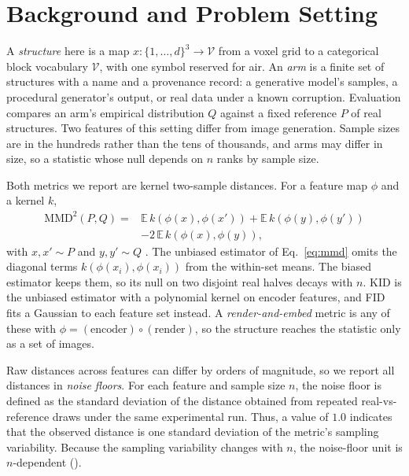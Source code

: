 \section{Background and Problem Setting}
\label{sec:background}

A \emph{structure} here is a map $x : \{1,\dots,d\}^3 \to \mathcal{V}$ from a voxel grid to a
categorical block vocabulary $\mathcal{V}$, with one symbol reserved for air. An
\emph{arm} is a finite set of structures with a name and a provenance record: a
generative model's samples, a procedural generator's output, or real data under a known
corruption. Evaluation compares an arm's empirical distribution $Q$ against a fixed
reference $P$ of real structures. Two features of this setting differ from image
generation. Sample sizes are in the hundreds rather than the tens of thousands, and arms
may differ in size, so a statistic whose null depends on $n$ ranks by sample size.

Both metrics we report are kernel two-sample distances. For a feature map $\phi$ and a
kernel $k$,
\begin{equation}
\begin{split}
\mathrm{MMD}^2(P,Q) ={}& \mathbb{E}\,k(\phi(x),\phi(x')) + \mathbb{E}\,k(\phi(y),\phi(y'))\\
  &- 2\,\mathbb{E}\,k(\phi(x),\phi(y)),
\end{split}
\label{eq:mmd}
\end{equation}
with $x,x' \sim P$ and $y,y' \sim Q$ \citep{gretton2012mmd}. The unbiased estimator of
Eq.~\ref{eq:mmd} omits the diagonal terms $k(\phi(x_i),\phi(x_i))$ from the within-set
means. The biased estimator keeps them, so its null on two disjoint real halves decays
with $n$. KID \citep{binkowski2018kid} is the unbiased estimator with a polynomial
kernel on encoder features, and FID \citep{heusel2017fid} fits a Gaussian to each feature
set instead. A \emph{render-and-embed} metric is any of these with $\phi =
(\text{encoder}) \circ (\text{render})$, so the structure reaches the statistic only as a
set of images. 

Raw distances across features can differ by orders of magnitude, so we report all distances in \emph{noise floors}. For each feature and sample size $n$, the noise floor is defined as the standard deviation of the distance obtained from repeated real-vs-reference draws under the same experimental run. Thus, a value of $1.0$ indicates that the observed distance is one standard deviation of the metric's sampling variability. Because the sampling variability changes with $n$, the noise-floor unit is $n$-dependent (). 

